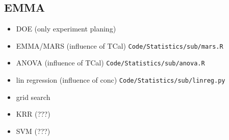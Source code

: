 \subsection{EMMA}
\begin{itemize}
    \item DOE (only experiment planing)
    \item EMMA/MARS (influence of TCal) \texttt{Code/Statistics/sub/mars.R}
    \item ANOVA (influence of TCal) \texttt{Code/Statistics/sub/anova.R}
    \item lin regression (influence of conc) \texttt{Code/Statistics/sub/linreg.py}
    \item grid search 
    \item KRR (???)
    \item SVM (???)
\end{itemize}

